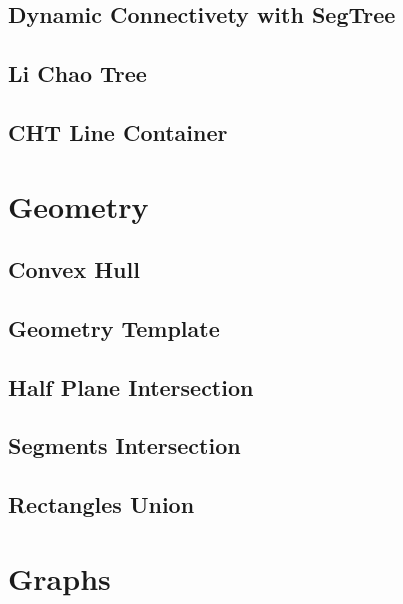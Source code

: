 \subsection{Dynamic Connectivety with SegTree}
\raggedbottom
\hrulefill
\subsection{Li Chao Tree}
\raggedbottom
\hrulefill
\subsection{CHT Line Container}
\raggedbottom
\hrulefill

\section{Geometry}
\subsection{Convex Hull}
\raggedbottom
\hrulefill
\subsection{Geometry Template}
\raggedbottom
\hrulefill
\subsection{Half Plane Intersection}
\raggedbottom
\hrulefill
\subsection{Segments Intersection}
\raggedbottom
\hrulefill
\subsection{Rectangles Union}
\raggedbottom
\hrulefill

\section{Graphs}
